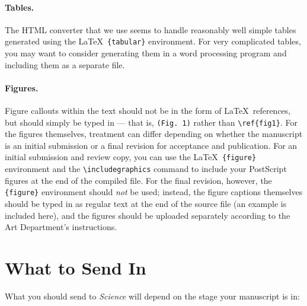 \documentclass[12pt]{article}
\begin{document}
\paragraph*{Tables.}  The HTML converter that we use seems to handle
reasonably well simple tables generated using the \LaTeX\
\texttt{\{tabular\}} environment.  For very complicated tables, you
may want to consider generating them in a word processing program and
including them as a separate file.

\paragraph*{Figures.}  Figure callouts within the text should not be
in the form of \LaTeX\ references, but should simply be typed in ---
that is, \verb+(Fig. 1)+ rather than \verb+\ref{fig1}+.  For the
figures themselves, treatment can differ depending on whether the
manuscript is an initial submission or a final revision for acceptance
and publication.  For an initial submission and review copy, you can
use the \LaTeX\ \verb+{figure}+ environment and the
\verb+\includegraphics+ command to include your PostScript figures at
the end of the compiled file.  For the final revision,
however, the \verb+{figure}+ environment should {\it not\/} be used;
instead, the figure captions themselves should be typed in as regular
text at the end of the source file (an example is included here), and
the figures should be uploaded separately according to the Art
Department's instructions.








\section*{What to Send In}

What you should send to {\it Science\/} will depend on the stage your manuscript is in:
\end{document}
